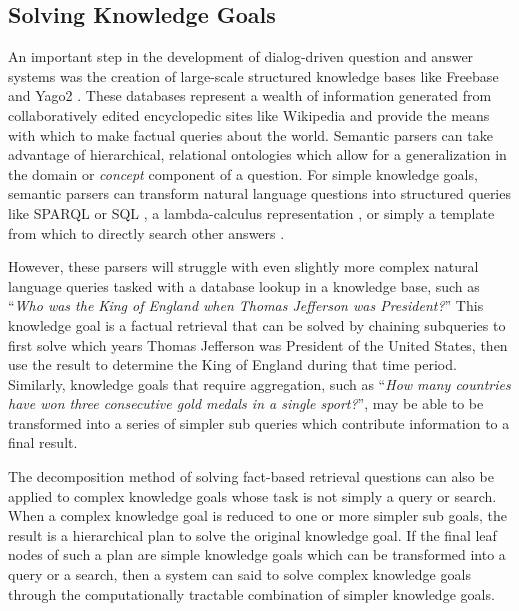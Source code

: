 \documentclass[11pt,letterpaper]{article}
\begin{document}
\subsection{Solving Knowledge Goals}


An important step in the development of dialog-driven question and answer systems was the creation of large-scale structured knowledge bases like Freebase \cite{bollacker_freebase:_2008} and Yago2 \cite{suchanek_yago:_2007}. These databases represent a wealth of information generated from collaboratively edited encyclopedic sites like Wikipedia and provide the means with which to make factual queries about the world. Semantic parsers can take advantage of hierarchical, relational ontologies which allow for a generalization in the domain or \textit{concept} component of a question. For simple knowledge goals, semantic parsers can transform natural language questions into structured queries like SPARQL or SQL \cite{yahya_natural_2012}, a lambda-calculus representation \cite{berant_semantic_2013}, or simply a template from which to directly search other answers \cite{unger_template-based_2012}.

However, these parsers will struggle with even slightly more complex natural language queries tasked with a database lookup in a knowledge base, such as ``\textit{Who was the King of England when Thomas Jefferson was President?}'' This knowledge goal is a factual retrieval that can be solved by chaining subqueries to first solve which years Thomas Jefferson was President of the United States, then use the result to determine the King of England during that time period. Similarly, knowledge goals that require aggregation, such as ``\textit{How many countries have won three consecutive gold medals in a single sport?}'', may be able to be transformed into a series of simpler sub queries which contribute information to a final result.

The decomposition method of solving fact-based retrieval questions can also be applied to complex knowledge goals whose task is not simply a query or search. When a complex knowledge goal is reduced to one or more simpler sub goals, the result is a hierarchical plan to solve the original knowledge goal. If the final leaf nodes of such a plan are simple knowledge goals which can be transformed into a query or a search, then a system can said to solve complex knowledge goals through the computationally tractable combination of simpler knowledge goals.
\end{document}
